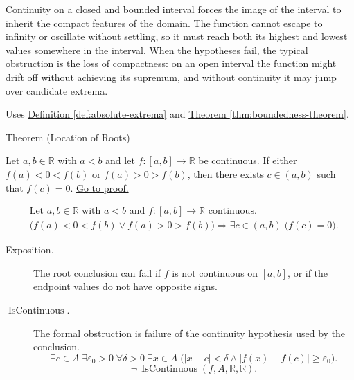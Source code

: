 \begin{remark*}[Interpretation]
Continuity on a closed and bounded interval forces the image of the interval to inherit the compact features of the domain. The function cannot escape to infinity or oscillate without settling, so it must reach both its highest and lowest values somewhere in the interval. When the hypotheses fail, the typical obstruction is the loss of compactness: on an open interval the function might drift off without achieving its supremum, and without continuity it may jump over candidate extrema.
\end{remark*}

\begin{dependencies}
Uses \hyperref[def:absolute-extrema]{Definition \ref{def:absolute-extrema}} and \hyperref[thm:boundedness-theorem]{Theorem \ref{thm:boundedness-theorem}}.
\end{dependencies}


\begin{theorembox}{Theorem (Location of Roots)}
\begin{theorem}
\label{thm:location-of-roots}
Let $a,b \in \mathbb{R}$ with $a<b$ and let $f:[a,b]\to\mathbb{R}$ be continuous. If either $f(a)<0<f(b)$ or $f(a)>0>f(b)$, then there exists $c\in(a,b)$ such that $f(c)=0$.
\hyperref[prf:location-of-roots]{Go to proof.}
\end{theorem}
\end{theorembox}

\begin{remark*}
\[
\begin{aligned}
&\text{Let } a,b \in \mathbb{R} \text{ with } a<b \text{ and } f:[a,b]\to\mathbb{R} \text{ continuous.}\\
&\bigl(f(a)<0<f(b) \lor f(a)>0>f(b)\bigr) \Rightarrow \exists c \in (a,b)\; \bigl(f(c)=0\bigr).
\end{aligned}
\]
\end{remark*}

\begin{remark*}
\begin{description}
  \item[Exposition.]
The root conclusion can fail if $f$ is not continuous on $[a,b]$, or if
the endpoint values do not have opposite signs.


  \item[\(\operatorname{IsContinuous}.\)]
  The formal obstruction is failure of the continuity hypothesis used by the conclusion.
  \[
  \exists c\in A\;\exists\varepsilon_0>0\;\forall\delta>0\;\exists x\in A\;
  \bigl(|x-c|<\delta\land |f(x)-f(c)|\ge\varepsilon_0\bigr).
  \]
  \[
  \neg\,\operatorname{IsContinuous}(f,A,\mathbb{R},\mathbb{R}).
  \]
\end{description}
\end{remark*}

